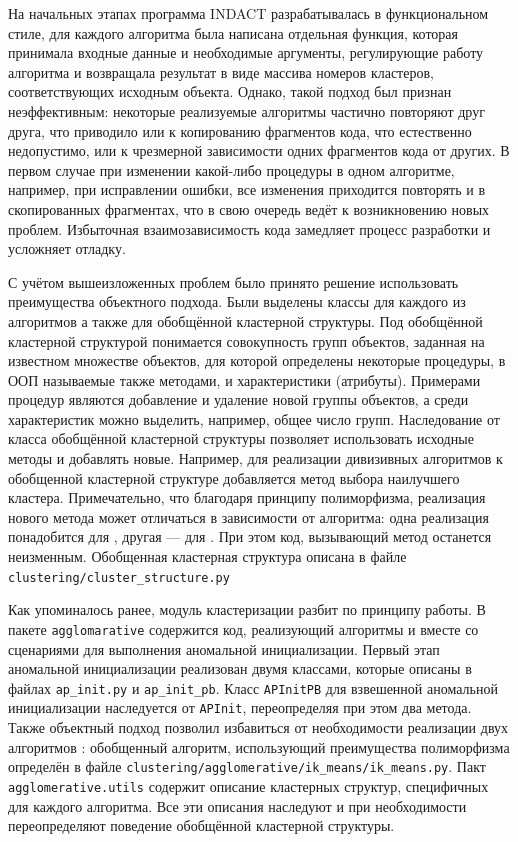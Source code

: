 \documentclass[12pt]{diploma}
\begin{document}
	На начальных этапах программа INDACT разрабатывалась в функциональном стиле, для каждого алгоритма была написана отдельная функция, которая принимала входные данные и необходимые аргументы, регулирующие работу алгоритма и возвращала результат в виде массива номеров кластеров, соответствующих исходным объекта. Однако, такой подход был признан неэффективным: некоторые реализуемые алгоритмы частично повторяют друг друга, что приводило или к копированию фрагментов кода, что естественно недопустимо, или к чрезмерной зависимости одних фрагментов кода от других. В первом случае при изменении какой-либо процедуры в одном алгоритме, например, при исправлении ошибки, все изменения приходится повторять и в скопированных фрагментах, что в свою очередь ведёт к возникновению новых проблем. Избыточная взаимозависимость кода замедляет процесс разработки и усложняет отладку. 
	
	С учётом вышеизложенных проблем было принято решение использовать преимущества объектного подхода. Были выделены классы для каждого из алгоритмов а также для обобщённой кластерной структуры. Под обобщённой кластерной структурой понимается совокупность групп объектов, заданная на известном множестве  объектов, для которой определены некоторые процедуры, в ООП называемые также методами, и характеристики (атрибуты). Примерами процедур являются добавление и удаление новой группы объектов, а среди характеристик можно выделить, например, общее число групп. Наследование от класса обобщённой кластерной структуры позволяет использовать исходные методы и добавлять новые. Например, для реализации дивизивных алгоритмов к обобщенной кластерной структуре добавляется метод выбора наилучшего кластера. Примечательно, что благодаря принципу полиморфизма, реализация нового метода может отличаться в зависимости от алгоритма: одна реализация понадобится для \dePDDP, другая --- для \BiKMR. При этом код, вызывающий метод останется неизменным. Обобщенная кластерная структура описана в файле \texttt{clustering/cluster\_structure.py}
	
	Как упоминалось ранее, модуль кластеризации разбит по принципу работы. В пакете \texttt{agglomarative} содержится код, реализующий алгоритмы \AWard и \AWardpb вместе со сценариями для выполнения аномальной инициализации. Первый этап аномальной инициализации реализован двумя классами, которые описаны в файлах \texttt{ap\_init.py} и \texttt{ap\_init\_pb}. Класс \texttt{APInitPB} для взвешенной аномальной инициализации наследуется от \texttt{APInit}, переопределяя при этом два метода. Также объектный подход позволил избавиться от необходимости реализации двух алгоритмов \ikmeans: обобщенный алгоритм,  использующий преимущества полиморфизма определён в файле \texttt{clustering/agglomerative/ik\_means/ik\_means.py}. Пакт \texttt{agglomerative.utils} содержит описание кластерных структур, специфичных для каждого алгоритма. Все эти описания наследуют и при необходимости переопределяют поведение обобщённой кластерной структуры. 
	
\end{document}
